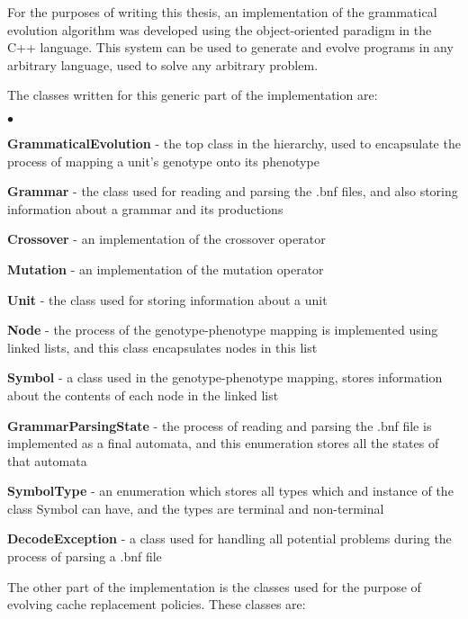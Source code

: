 For the purposes of writing this thesis, an implementation of the grammatical evolution algorithm was developed using the object-oriented paradigm in the C++ language. This system can be used to generate and evolve programs in any arbitrary language, used to solve any arbitrary problem.

The classes written for this generic part of the implementation are:

\begin{list}{$\bullet$}{}  	
	\item \textbf{GrammaticalEvolution} - the top class in the hierarchy, used to encapsulate the process of mapping a unit's genotype onto its phenotype
	\item \textbf{Grammar} - the class used for reading and parsing the .bnf files, and also storing information about a grammar and its productions 
	\item \textbf{Crossover} - an implementation of the crossover operator
	\item \textbf{Mutation} - an implementation of the mutation operator
	\item \textbf{Unit} - the class used for storing information about a unit
	\item \textbf{Node} - the process of the genotype-phenotype mapping is implemented using linked lists, and this class encapsulates nodes in this list
	\item \textbf{Symbol} - a class used in the genotype-phenotype mapping, stores information about the contents of each node in the linked list
	\item \textbf{GrammarParsingState} - the process of reading and parsing the .bnf file is implemented as a final automata, and this enumeration stores all the states of that automata
	\item \textbf{SymbolType} - an enumeration which stores all types which and instance of the class Symbol can have, and the types are terminal and non-terminal
	\item \textbf{DecodeException} - a class used for handling all potential problems during the process of parsing a .bnf file
\end{list}

The other part of the implementation is the classes used for the purpose of evolving cache replacement policies. These classes are:

